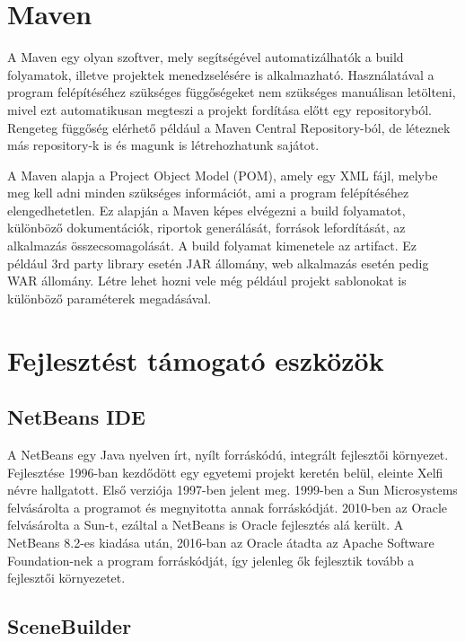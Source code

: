 \section{Maven}

A Maven egy olyan szoftver, mely segítségével automatizálhatók a build folyamatok, illetve projektek menedzselésére is alkalmazható. Használatával a program felépítéséhez szükséges függőségeket nem szükséges manuálisan letölteni, mivel ezt automatikusan megteszi a projekt fordítása előtt egy repositoryból. Rengeteg függőség elérhető például a Maven Central Repository-ból, de léteznek más repository-k is és magunk is létrehozhatunk sajátot. 

A Maven alapja a Project Object Model (POM), amely egy XML fájl, melybe meg kell adni minden szükséges információt, ami a program felépítéséhez elengedhetetlen. Ez alapján a Maven képes elvégezni a build folyamatot, különböző dokumentációk, riportok generálását, források lefordítását, az alkalmazás összecsomagolását. A build folyamat kimenetele az artifact. Ez például 3rd party library esetén JAR állomány, web alkalmazás esetén pedig WAR állomány. Létre lehet hozni vele még például projekt sablonokat is különböző paraméterek megadásával. 

\section{Fejlesztést támogató eszközök}

\subsection{NetBeans IDE} 

A NetBeans egy Java nyelven írt, nyílt forráskódú, integrált fejlesztői környezet. Fejlesztése 1996-ban kezdődött egy egyetemi projekt keretén belül, eleinte Xelfi névre hallgatott. Első verziója 1997-ben jelent meg. 1999-ben a Sun Microsystems felvásárolta a programot és megnyitotta annak forráskódját. 2010-ben az Oracle felvásárolta a Sun-t, ezáltal a NetBeans is Oracle fejlesztés alá került. A NetBeans 8.2-es kiadása után, 2016-ban az Oracle átadta az Apache Software Foundation-nek a program forráskódját, így jelenleg ők fejlesztik tovább a fejlesztői környezetet.

\subsection{SceneBuilder}

